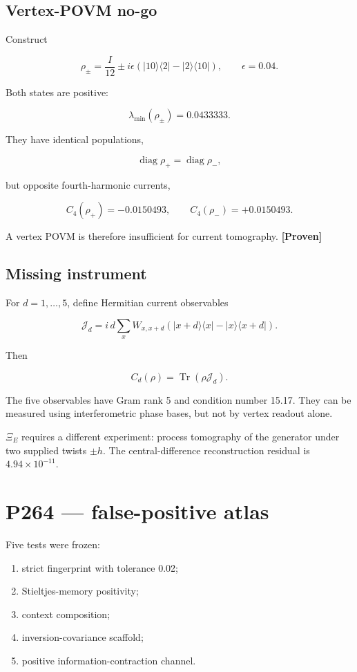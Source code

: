 \documentclass[11pt,a4paper,openany]{report}
\newcommand{\statusProven}{\textcolor{fingreen}{[Proven]}}
\begin{document}
\section{Vertex-POVM no-go}

Construct

\[
\rho_\pm
=
\frac{I}{12}
\pm i\epsilon
\left(|10\rangle\langle2|-|2\rangle\langle10|\right),
\qquad \epsilon=0.04.
\]

Both states are positive:

\[
\lambda_{\min}(\rho_\pm)=0.0433333.
\]

They have identical populations,

\[
\operatorname{diag}\rho_+=\operatorname{diag}\rho_-,
\]

but opposite fourth-harmonic currents,

\[
C_4(\rho_+)=-0.0150493,\qquad
C_4(\rho_-)=+0.0150493.
\]

A vertex POVM is therefore insufficient for current tomography. \textbf{\statusProven{}}

\section{Missing instrument}

For \(d=1,\ldots,5\), define Hermitian current observables

\[
\mathcal J_d
=
i\,d\sum_xW_{x,x+d}
\left(|x+d\rangle\langle x|-|x\rangle\langle x+d|\right).
\]

Then

\[
C_d(\rho)=\operatorname{Tr}(\rho\mathcal J_d).
\]

The five observables have Gram rank 5 and condition number 15.17. They can be measured using interferometric phase bases, but not by vertex readout alone.

\(\Xi_E\) requires a different experiment: process tomography of the generator under two supplied twists \(\pm h\). The central-difference reconstruction residual is \(4.94\times10^{-11}\).

\chapter{P264 --- false-positive atlas}

Five tests were frozen:

\begin{enumerate}
\item 
strict fingerprint with tolerance 0.02;

\item 
Stieltjes-memory positivity;

\item 
context composition;

\item 
inversion-covariance scaffold;

\item 
positive information-contraction channel.

\end{enumerate}
\end{document}
